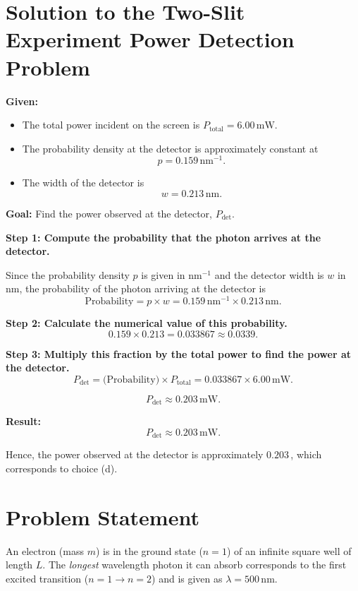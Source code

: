 \documentclass[12pt]{article}
\title{}
\author{Jerich Lee}
\date{\today}
\theoremstyle{definition} %
\theoremstyle{plain} %
\begin{document}
\maketitle
\section*{Solution to the Two-Slit Experiment Power Detection Problem}

\textbf{Given:}
\begin{itemize}
    \item The total power incident on the screen is \(P_{\text{total}} = 6.00 \,\text{mW}\).
    \item The probability density at the detector is approximately constant at 
    \[
        p = 0.159 \,\text{nm}^{-1}.
    \]
    \item The width of the detector is 
    \[
        w = 0.213 \,\text{nm}.
    \]
\end{itemize}

\textbf{Goal:} Find the power observed at the detector, \(P_{\text{det}}\).

\textbf{Step 1: Compute the probability that the photon arrives at the detector.}

Since the probability density \(p\) is given in \(\text{nm}^{-1}\) and the detector width is \(w\) in \(\text{nm}\), the probability of the photon arriving at the detector is
\[
    \text{Probability} = p \times w = 0.159 \,\text{nm}^{-1} \times 0.213 \,\text{nm}.
\]

\textbf{Step 2: Calculate the numerical value of this probability.}
\[
    0.159 \times 0.213 = 0.033867 \approx 0.0339.
\]

\textbf{Step 3: Multiply this fraction by the total power to find the power at the detector.}
\[
    P_{\text{det}} = \text{(Probability)} \times P_{\text{total}} 
    = 0.033867 \times 6.00 \,\text{mW}.
\]

\[
    P_{\text{det}} \approx 0.203 \,\text{mW}.
\]

\textbf{Result:} 
\[
    P_{\text{det}} \approx 0.203 \,\text{mW}.
\]

Hence, the power observed at the detector is approximately \(0.203\)\,, which corresponds to choice (d).

\section*{Problem Statement}

An electron (mass $m$) is in the ground state ($n=1$) of an infinite square well of length $L$. 
The {\em longest} wavelength photon it can absorb corresponds to the first excited transition 
($n=1 \to n=2$) and is given as $\lambda = 500\,\text{nm}$. 
\end{document}
